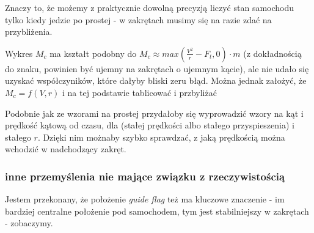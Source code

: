 \documentclass[12pt]{article}
\begin{document}
Znaczy to, że możemy z praktycznie dowolną precyzją liczyć stan samochodu tylko kiedy jedzie po prostej - w zakrętach musimy się na razie zdać na przybliżenia.

Wykres $M_c$ ma kształt podobny do $M_c \approx max(\frac{V^2}{r} - F_t, 0) \cdot  m$ (z dokładnością do znaku, powinien być ujemny na zakrętach o ujemnym kącie), ale nie udało się uzyskać współczyników, które dałyby bliski zeru błąd. Można jednak założyć, że $M_c = f(V, r)$ i na tej podstawie tablicować i przbyliżać

Podobnie jak ze wzorami na prostej przydałoby się wyprowadzić wzory na kąt i prędkość kątową od czasu, dla (stałej prędkości albo stałego przyspieszenia) i stałego $r$. Dzięki nim możnaby szybko sprawdzać, z jaką prędkością można wchodzić w nadchodzący zakręt.

\subsubsection{inne przemyślenia nie mające związku z rzeczywistością}
Jestem przekonany, że położenie \textit{guide flag} też ma kluczowe znaczenie - im bardziej centralne położenie pod samochodem, tym jest stabilniejszy w zakrętach - zobaczymy.
\end{document}
